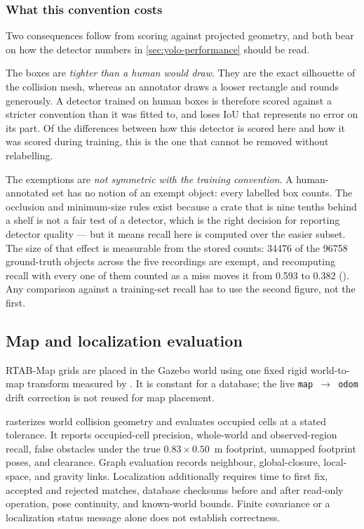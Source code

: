 \subsubsection{What this convention costs}

Two consequences follow from scoring against projected geometry, and both bear on
how the detector numbers in \cref{sec:yolo-performance} should be read.

The boxes are \emph{tighter than a human would draw}. They are the exact
silhouette of the collision mesh, whereas an annotator draws a looser rectangle
and rounds generously. A detector trained on human boxes is therefore scored
against a stricter convention than it was fitted to, and loses IoU that
represents no error on its part. Of the differences between how this detector
is scored here and how it was scored during training, this is the one that cannot
be removed without relabelling.

The exemptions are \emph{not symmetric with the training convention}. A
human-annotated set has no notion of an exempt object: every labelled box counts.
The occlusion and minimum-size rules exist because a crate that is nine tenths
behind a shelf is not a fair test of a detector, which is the right decision for
reporting detector quality --- but it means recall here is computed over the
easier subset. The size of that effect is measurable from the stored counts:
\num{34476} of the \num{96758} ground-truth objects across the five recordings
are exempt, and recomputing recall with every one of them counted as a miss moves
it from \num{0.593} to \num{0.382}
(). Any comparison against a
training-set recall has to use the second figure, not the first.

\subsection{Map and localization evaluation}

RTAB-Map grids are placed in the Gazebo world using one fixed rigid world-to-map
transform measured by . It is constant for a database;
the live \texttt{map~$\rightarrow$~odom} drift correction is not reused for map
placement.

 rasterizes world collision geometry and evaluates
occupied cells at a stated tolerance. It reports occupied-cell precision,
whole-world and observed-region recall, false obstacles under the true
$0.83\times0.50$~m footprint, unmapped footprint poses, and clearance. Graph
evaluation records neighbour, global-closure, local-space, and gravity links.
Localization additionally requires time to first fix, accepted and rejected
matches, database checksums before and after read-only operation, pose continuity,
and known-world bounds. Finite covariance or a localization status message alone
does not establish correctness.

